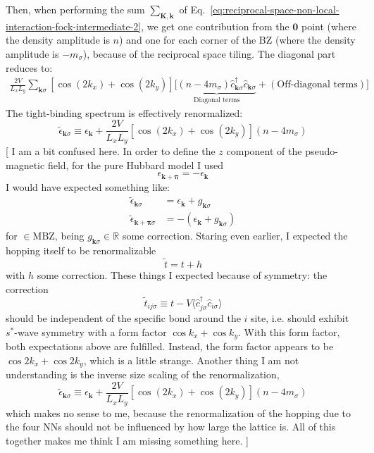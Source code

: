 Then, when performing the sum $\sum_{\mathbf{K}, \mathbf{k}}$ of Eq.~\eqref{eq:reciprocal-space-non-local-interaction-fock-intermediate-2}, we get one contribution from the $\mathbf{0}$ point (where the density amplitude is $n$) and one for each corner of the BZ (where the density amplitude is $-m_\sigma$), because of the reciprocal space tiling. The diagonal part reduces to:
\begin{multline}
	\frac{2V}{L_x L_y} \sum_{\mathbf{k}\sigma} \left[
		\cos \left(
			2k_x
		\right)	+ \cos \left(
			2k_y
		\right)	
	\right] \Big[
		\underbrace{
			(n-4m_\sigma) \hat c_{\mathbf{k}\sigma}^\dagger \hat c_{\mathbf{k}\sigma}
		}_\text{Diagonal terms}
		+
		(\text{Off-diagonal terms})
	\Big]
	\label{eq:reciprocal-space-non-local-interaction-fock-intermediate-3}
\end{multline}
The tight-binding spectrum is effectively renormalized:
\[
	\tilde{\epsilon}_{\mathbf{k}\sigma} \equiv \epsilon_\mathbf{k} + \frac{2V}{L_xL_y} \left[
		\cos\left(2k_x\right)+\cos\left(2k_y\right)
	\right]	(n-4m_\sigma)
\]
{\color{tabred}[
	I am a bit confused here. In order to define the $z$ component of the pseudo-magnetic field, for the pure Hubbard model I used
	\[
		\epsilon_{\mathbf{k}+\bm{\pi}} = - \epsilon_\mathbf{k}
	\]
	I would have expected something like:
	\[
	\begin{aligned}
		\tilde{\epsilon}_{\mathbf{k}\sigma} &= \epsilon_\mathbf{k} + g_{\mathbf{k}\sigma} \\
		\tilde{\epsilon}_{\mathbf{k}+\bm{\pi}\sigma} &= -(\epsilon_\mathbf{k} + g_{\mathbf{k}\sigma})
	\end{aligned}
	\]
	for $\mathbf\in\mathrm{MBZ}$, being $g_{\mathbf{k}\sigma}\in\mathbb{R}$ some correction. Staring even earlier, I expected the hopping itself to be renormalizable
	\[
		\tilde{t} = t + h
	\]
	with $h$ some correction. These things I expected because of symmetry: the correction
	\[
		\tilde{t}_{ij\sigma} \equiv t - V \langle
			\hat c_{j\sigma}^\dagger \hat c_{i\sigma}
		\rangle
	\]
	should be independent of the specific bond around the $i$ site, i.e. should exhibit $s^*$-wave symmetry with a form factor $\cos k_x + \cos k_y$. With this form factor, both expectations above are fulfilled. Instead, the form factor appears to be $\cos 2k_x + \cos 2k_y$, which is a little strange. Another thing I am not understanding is the inverse size scaling of the renormalization,
	\[
		\tilde{\epsilon}_{\mathbf{k}\sigma} \equiv \epsilon_\mathbf{k} + \frac{2V}{L_xL_y} \left[
		\cos\left(2k_x\right)+\cos\left(2k_y\right)
		\right]	(n-4m_\sigma)
	\]
	which makes no sense to me, because the renormalization of the hopping due to the four NNs should not be influenced by how large the lattice is. All of this together makes me think I am missing something here.
]}

